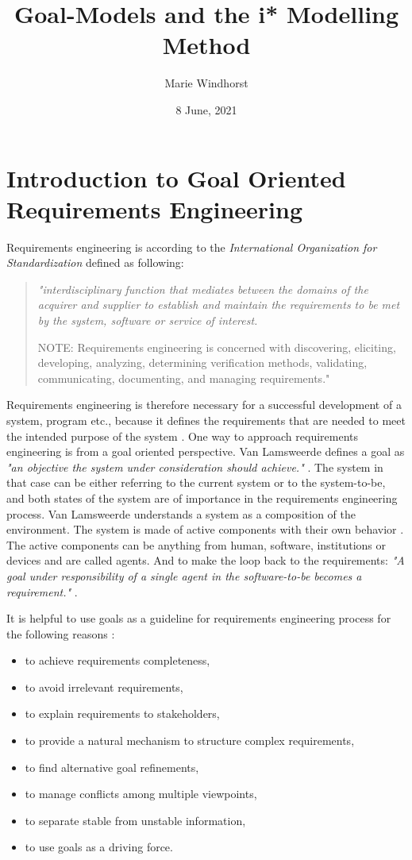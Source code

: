 \documentclass[11pt,a4paper]{article}
\title{Goal-Models and the i* Modelling Method }
\author{Marie Windhorst}
\date{8 June, 2021}
\begin{document}
\maketitle

\section{Introduction to Goal Oriented Requirements Engineering}
Requirements engineering is according to the \textit{International
  Organization for Standardization} defined as following:
\begin{quote}\it 
  "interdisciplinary function that mediates between the domains of the
  acquirer and supplier to establish and maintain the requirements to be met
  by the system, software or service of interest.

  NOTE: Requirements engineering is concerned with discovering, eliciting,
  developing, analyzing, determining verification methods, validating,
  communicating, documenting, and managing requirements." \cite[p.6]{.2011}
\end{quote}
Requirements engineering is therefore necessary for a successful development
of a system, program etc., because it defines the requirements that are needed
to meet the intended purpose of the system \cite[p.33]{Singh.2008}. One way to
approach requirements engineering is from a goal oriented perspective. Van
Lamsweerde defines a goal as \textit{"an objective the system under
  consideration should achieve."} \cite[p.250]{vanLamsweerde.2001}. The
system in that case can be either referring to the current system or to the
system-to-be, and both states of the system are of importance in the
requirements engineering process. Van Lamsweerde understands a system as a
composition of the environment. The system is made of active components with
their own behavior \cite{vanLamsweerde.2001}. The active components can be
anything from human, software, institutions or devices and are called
agents. And to make the loop back to the requirements: \textit{"A goal under
  responsibility of a single agent in the software-to-be becomes a
  requirement."} \cite[p.250]{vanLamsweerde.2001}.

It is helpful to use goals as a guideline for requirements engineering process
for the following reasons \cite[p.250]{vanLamsweerde.2001}:
\begin{itemize}
\item to achieve requirements completeness,
\item to avoid irrelevant requirements,
\item to explain requirements to stakeholders,
\item to provide a natural mechanism to structure complex requirements,
\item to find alternative goal refinements,
\item to manage conflicts among multiple viewpoints,
\item to separate stable from unstable information,
\item to use goals as a driving force.
\end{itemize}
\end{document}
